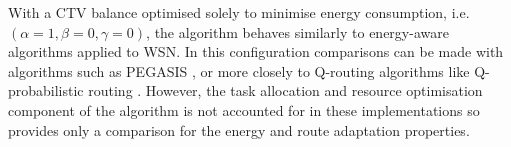 
With a CTV balance optimised solely to minimise energy consumption, i.e. $(\alpha=1,\beta=0,\gamma=0)$, the \acronymWSNOptimisation{}{} algorithm behaves similarly to energy-aware algorithms applied to WSN. In this configuration comparisons can be made with algorithms such as PEGASIS \citep{Lindsey2002}, or more closely to Q-routing algorithms like Q-probabilistic routing \citep{Arroyo-Valles2007}. However, the task allocation and resource optimisation component of the \acronymWSNOptimisation{}{} algorithm is not accounted for in these implementations so provides only a comparison for the energy and route adaptation properties. 
